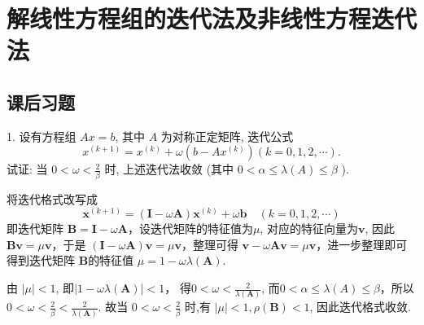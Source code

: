 \newpage
\section{解线性方程组的迭代法及非线性方程迭代法}
\subsection{课后习题}

\begin{tcolorbox}[breakable,enhanced,arc=0mm,outer arc=0mm,
		boxrule=0pt,toprule=1pt,leftrule=0pt,bottomrule=1pt, rightrule=0pt,left=0.2cm,right=0.2cm,
		titlerule=0.5em,toptitle=0.1cm,bottomtitle=-0.1cm,top=0.2cm,
		colframe=white!10!biru,colback=white!90!biru,coltitle=white,
            coltext=black,title =2024-04, title style={white!10!biru}, before skip=8pt, after skip=8pt,before upper=\hspace{2em},
		fonttitle=\bfseries,fontupper=\normalsize]
  
1. 设有方程组 $ A x=b $, 其中 $ A $ 为对称正定矩阵, 迭代公式
$$
x^{(k+1)}=x^{(k)}+\omega\left(b-A x^{(k)}\right)(k=0,1,2, \cdots) .
$$
试证: 当 $ 0<\omega<\frac{2}{\beta} $ 时, 上述迭代法收敛
 (其中  $0<\alpha \leqslant \lambda(A) \leqslant \beta$  ). 
\tcblower

将迭代格式改写成
$$
\boldsymbol{x}^{(k+1)}=(\boldsymbol{I}-\omega \boldsymbol{A}) \boldsymbol{x}^{(k)}+\omega \boldsymbol{b} \quad(k=0,1,2, \cdots)
$$
即迭代矩阵 $ \boldsymbol{B}=\boldsymbol{I}-\omega \boldsymbol{A} $，设迭代矩阵的特征值为$\mu$, 对应的特征向量为$\boldsymbol{v}$, 因此 $ \boldsymbol{Bv} = \mu \boldsymbol{v} $，于是 $ (\boldsymbol{I}-\omega \boldsymbol{A})\boldsymbol{v} = \mu \boldsymbol{v} $，整理可得 $ \boldsymbol{v} - \omega \boldsymbol{A}\boldsymbol{v} = \mu \boldsymbol{v} $，进一步整理即可得到迭代矩阵 $ \boldsymbol{B}$的特征值 $ \mu = 1 - \omega \lambda(\boldsymbol{A}) $.

由 $ |\mu|<1$, 即$|1-{\omega \lambda}(\boldsymbol{A})|<1 $， 得$0<\omega<\frac{2}{\lambda(\boldsymbol{A})}$,
而$0<\alpha \leq \lambda(A) \leq \beta$，所以$ 0<\omega<\frac{2}{\beta}<\frac{2}{\lambda(\boldsymbol{A})}$.
故当 $0<\omega<\frac{2}{\beta} $ 时,有 $|\mu|<1, \rho(\boldsymbol{B})<1 $, 因此迭代格式收敛.
\end{tcolorbox}


